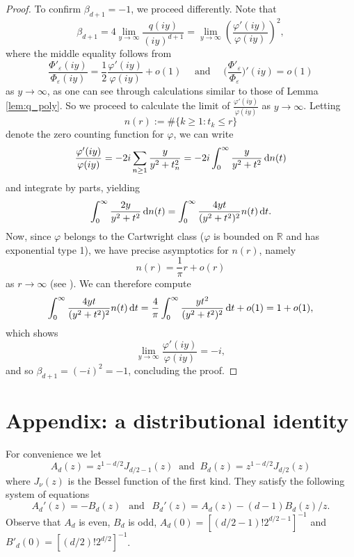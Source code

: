 \documentclass[a4paper,reqno,12pt]{amsart}
\renewcommand{\P}{\Phi}
\renewcommand{\r}{\mathbb{R}}
\newcommand{\ep}{\varepsilon}
\newcommand{\p}{\varphi}
\renewcommand{\d}{{\rm d}}
\begin{document}
\begin{proof}
To confirm $\beta_{d+1} = -1$, we proceed differently. Note that
\begin{equation*}
    \beta_{d+1}=4  \lim_{y\to \infty} \frac{q(iy)}{(iy)^{d+1}} =\lim_{y \to \infty} \left(\frac{\p'(iy)}{\p(iy)}\right)^2,
\end{equation*}
where the middle equality follows from 
\begin{equation*}
    \frac{\P'_\ep (i y)}{\P_\ep(i y)}  = \frac{1}{2}\frac{\p'(iy)}{\p(iy)} + o(1) \quad \text{ and } \quad \bigg(\frac{\P'_\ep}{\P_\ep}\bigg)'(iy) = o(1)
\end{equation*}
as $y\to\infty$, as one can see through calculations similar to those of Lemma \ref{lem:q_poly}. So we proceed to calculate the limit of $\frac{\p'(iy)}{\p(iy)}$ as $y\to \infty$. Letting 
\begin{equation*}
    n(r) := \# \{ k \geq 1  : t_k \leq r \}
\end{equation*}
denote the zero counting function for $\p$, we can write
\begin{equation*}
    \frac{\p'(iy)}{\p(iy)} = -2i \sum_{n\geq 1}\frac{y}{y^2 + t_n^2} = - 2i \int_0^\infty \frac{y}{y^2 + t^2} \, \d n (t)
\end{equation*}
and integrate by parts, yielding
\begin{align*}
    \int_0^\infty \frac{2y}{y^2 + t^2} \, \d n (t) =  \int_0^\infty \frac{4 yt}{(y^2 + t^2)^2} n(t) \, \d t .
\end{align*}
Now, since $\p$ belongs to the Cartwright class ($\p$ is bounded on $\r$ and has exponential type 1), we have precise asymptotics for $n(r)$, namely
\begin{equation*}
    n(r) = \frac{1}{\pi}r + o (r)
\end{equation*}
as $r \to \infty$ (see \cite[p. 127]{Lev}). We can therefore compute 
\begin{align*}
    \int_0^\infty \frac{4 yt}{(y^2 + t^2)^2} n(t) \, \d t = \frac{4}{\pi} \int_0^\infty \frac{yt^2}{(y^2 + t^2)^2} \, \d t + o(1) = 1 + o(1),
\end{align*}
which shows
\begin{equation*}
    \lim_{y \to \infty} \frac{\p'(iy)}{\p(iy)} = -i,
\end{equation*}
and so $\beta_{d+1} = (-i)^2 = -1$, concluding the proof.
\end{proof}

\section{Appendix: a distributional identity}
For convenience we let
$$A_d(z)= z^{1-d/2} J_{d/2-1}(z) \ \text{ and } \ B_d(z)= z^{1-d/2}J_{d/2}(z) $$
where $J_\nu(z)$ is the Bessel function of the first kind. They satisfy the following system of equations
$$
A_d'(z)=-B_d(z) \ \ \text{ and } \ \ B_d'(z)=A_d(z)-(d-1)B_d(z)/z.
$$
Observe that $A_d$ is even, $B_d$ is odd, $A_d(0)=[(d/2-1)!2^{d/2-1}]^{-1}$ and $B'_d(0)=[(d/2)!2^{d/2}]^{-1}$. 
\end{document}
